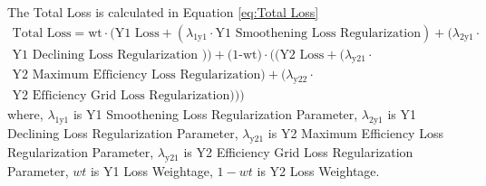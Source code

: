 \documentclass{report} %
\begin{document}
The Total Loss is calculated in Equation \ref{eq:Total Loss}
\begin{equation}
    \begin{split}
\text{Total Loss} = \text{wt} \cdot (\text{Y1 Loss} + (\lambda_{\text{1y1}} \cdot \text{Y1 Smoothening Loss Regularization}) +  (\lambda_{\text{2y1}} \cdot \\
\text{Y1 Declining Loss Regularization })) + \text{(1-wt)} \cdot ((\text{Y2 Loss} + (\lambda_{\text{y21}} \cdot \\ 
\text{Y2 Maximum Efficiency Loss Regularization}) + (\lambda_{\text{y22}} \cdot \\
\text{Y2 Efficiency Grid Loss Regularization})))
    \end{split}
    \label{eq:Total Loss}
\end{equation}
where, \(\lambda_{\text{1y1}}\) is Y1 Smoothening Loss Regularization Parameter, \(\lambda_{\text{2y1}}\) is Y1 Declining Loss Regularization Parameter,
        \(\lambda_{\text{y21}}\) is Y2 Maximum Efficiency Loss Regularization Parameter, \(\lambda_{\text{y21}}\) is Y2 Efficiency Grid Loss Regularization Parameter, 
        \(wt\) is Y1 Loss Weightage, \(1-wt\) is Y2 Loss Weightage. \\
\end{document}
